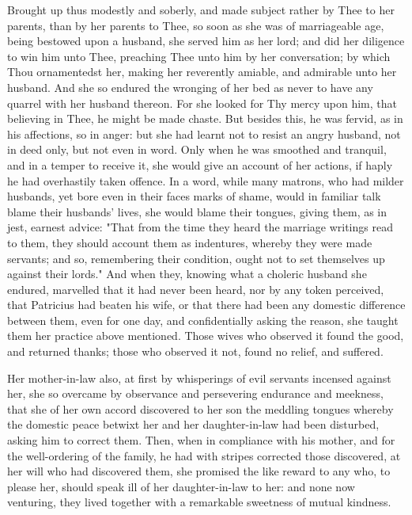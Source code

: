 \documentclass[b5paper,openright,12pt,twoside]{book}
\begin{document}
Brought up thus modestly and soberly, and made subject rather by Thee
to her parents, than by her parents to Thee, so soon as she was of
marriageable age, being bestowed upon a husband, she served him as her
lord; and did her diligence to win him unto Thee, preaching Thee unto
him by her conversation; by which Thou ornamentedst her, making her
reverently amiable, and admirable unto her husband. And she so endured
the wronging of her bed as never to have any quarrel with her husband
thereon. For she looked for Thy mercy upon him, that believing in Thee,
he might be made chaste. But besides this, he was fervid, as in his
affections, so in anger: but she had learnt not to resist an angry
husband, not in deed only, but not even in word. Only when he was
smoothed and tranquil, and in a temper to receive it, she would give an
account of her actions, if haply he had overhastily taken offence. In
a word, while many matrons, who had milder husbands, yet bore even in
their faces marks of shame, would in familiar talk blame their husbands'
lives, she would blame their tongues, giving them, as in jest, earnest
advice: "That from the time they heard the marriage writings read to
them, they should account them as indentures, whereby they were
made servants; and so, remembering their condition, ought not to set
themselves up against their lords." And when they, knowing what a
choleric husband she endured, marvelled that it had never been heard,
nor by any token perceived, that Patricius had beaten his wife, or that
there had been any domestic difference between them, even for one day,
and confidentially asking the reason, she taught them her practice above
mentioned. Those wives who observed it found the good, and returned
thanks; those who observed it not, found no relief, and suffered.

Her mother-in-law also, at first by whisperings of evil servants
incensed against her, she so overcame by observance and persevering
endurance and meekness, that she of her own accord discovered to her
son the meddling tongues whereby the domestic peace betwixt her and her
daughter-in-law had been disturbed, asking him to correct them. Then,
when in compliance with his mother, and for the well-ordering of the
family, he had with stripes corrected those discovered, at her will who
had discovered them, she promised the like reward to any who, to please
her, should speak ill of her daughter-in-law to her: and none now
venturing, they lived together with a remarkable sweetness of mutual
kindness.
\end{document}

